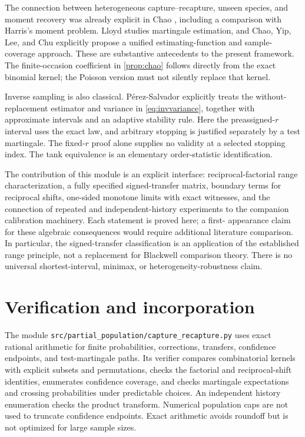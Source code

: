 \documentclass[11pt]{article}
\theoremstyle{remark}\newtheorem{remark}[theorem]{Remark}
\begin{document}
The connection between heterogeneous capture--recapture, unseen species,
and moment recovery was already explicit in Chao \cite{Chao1987}, including
a comparison with Harris's moment problem. Lloyd \cite{Lloyd1994} studies
martingale estimation, and Chao, Yip, Lee, and Chu \cite{Chao2001} explicitly
propose a unified estimating-function and sample-coverage approach. These
are substantive antecedents to the present framework. The finite-occasion
coefficient in \cref{prop:chao} follows directly from the exact binomial
kernel; the Poisson version must not silently replace that kernel.

Inverse sampling is also classical. P\'erez-Salvador \cite{Perez2026}
explicitly treats the without-replacement estimator and variance in
\eqref{eq:invvariance}, together with approximate intervals and an adaptive
stability rule. Here the preassigned-$r$ interval uses the exact law, and
arbitrary stopping is justified separately by a test martingale. The
fixed-$r$ proof alone supplies no validity at a selected stopping index.
The tank equivalence is an elementary order-statistic identification.

The contribution of this module is an explicit interface: reciprocal-factorial
range characterization, a fully specified signed-transfer matrix, boundary
terms for reciprocal shifts, one-sided monotone limits with exact witnesses,
and the connection of repeated and independent-history experiments to the
companion calibration machinery. Each statement is proved here; a first-
appearance claim for these algebraic consequences would require additional
literature comparison. In particular, the signed-transfer classification is
an application of the established range principle, not a replacement for
Blackwell comparison theory. There is no universal shortest-interval,
minimax, or heterogeneity-robustness claim.

\section{Verification and incorporation}
The module \texttt{src/partial\_population/capture\_recapture.py} uses exact
rational arithmetic for finite probabilities, corrections, transfers,
confidence endpoints, and test-martingale paths. Its verifier compares
combinatorial kernels with explicit subsets and permutations, checks the
factorial and reciprocal-shift identities, enumerates confidence coverage,
and checks martingale expectations and crossing probabilities under
predictable choices. An independent history enumeration checks the product
transform. Numerical population caps are not used to truncate confidence
endpoints. Exact arithmetic avoids roundoff but is not optimized for large
sample sizes.
\end{document}
